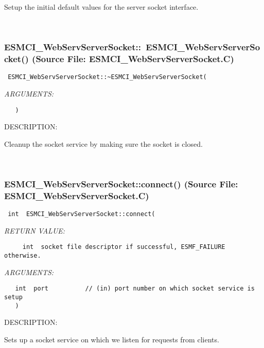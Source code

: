       Setup the initial default values for the server socket interface.
   
 
\mbox{}\hrulefill\
 
\subsubsection{ESMCI\_WebServServerSocket::~ESMCI\_WebServServerSocket() (Source File: ESMCI\_WebServServerSocket.C)}


  
\begin{verbatim} ESMCI_WebServServerSocket::~ESMCI_WebServServerSocket(\end{verbatim}{\em ARGUMENTS:}
\begin{verbatim}   )\end{verbatim}
{\sf DESCRIPTION:\\ }


      Cleanup the socket service by making sure the socket is closed.
   
 
\mbox{}\hrulefill\
 
\subsubsection{ESMCI\_WebServServerSocket::connect() (Source File: ESMCI\_WebServServerSocket.C)}


  
\begin{verbatim} int  ESMCI_WebServServerSocket::connect(\end{verbatim}{\em RETURN VALUE:}
\begin{verbatim}     int  socket file descriptor if successful, ESMF_FAILURE otherwise.\end{verbatim}{\em ARGUMENTS:}
\begin{verbatim}   int  port          // (in) port number on which socket service is setup
   )\end{verbatim}
{\sf DESCRIPTION:\\ }


      Sets up a socket service on which we listen for requests from clients.
  
\setlength{\parskip}{\oldparskip}
\setlength{\parindent}{\oldparindent}
\setlength{\baselineskip}{\oldbaselineskip}
